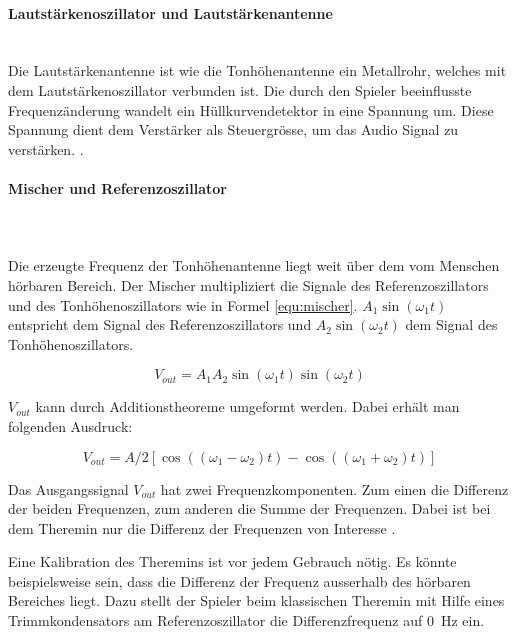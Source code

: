 \paragraph{Lautstärkenoszillator und Lautstärkenantenne}\mbox{}\\ 

Die Lautstärkenantenne ist wie die Tonhöhenantenne ein Metallrohr, welches mit dem Lautstärkenoszillator verbunden ist. Die durch den Spieler beeinflusste Frequenzänderung wandelt ein Hüllkurvendetektor in eine Spannung um. Diese Spannung dient dem Verstärker als Steuergrösse, um das Audio Signal zu verstärken. \cite{Franzis}. 

\paragraph{Mischer und Referenzoszillator}\mbox{}\\ 
\\Die erzeugte Frequenz der Tonhöhenantenne liegt weit über dem vom Menschen hörbaren Bereich. Der Mischer multipliziert die Signale des Referenzoszillators und des Tonhöhenoszillators wie in Formel \ref{equ:mischer}. $A_1\sin(\omega_1t)$ entspricht dem Signal des Referenzoszillators und $A_2\sin(\omega_2t)$ dem Signal des Tonhöhenoszillators.

\begin{equation}
V_{out} = A_{1}A_{2} \sin(\omega_{1}t)   \sin(\omega_{2}t) 
\label{equ:mischer}
\end{equation}

$V_{out}$ kann durch Additionstheoreme umgeformt werden. Dabei erhält man folgenden Ausdruck:

\begin{equation}
V_{out} = A/2[\cos((\omega_{1}-\omega_{2})t)  - \cos((\omega_{1}+\omega_{2})t) ]
\label{equ:mischer_trigo}
\end{equation}

Das Ausgangssignal $V_{out}$ hat zwei Frequenzkomponenten. Zum einen die Differenz der beiden Frequenzen, zum anderen die Summe der Frequenzen. Dabei ist bei dem Theremin nur die Differenz der Frequenzen von Interesse \cite{physik_theremin}.

Eine Kalibration des Theremins ist vor jedem Gebrauch nötig. Es könnte beispielsweise sein, dass die Differenz der Frequenz ausserhalb des hörbaren Bereiches liegt. Dazu stellt der Spieler beim klassischen Theremin mit Hilfe eines Trimmkondensators am Referenzoszillator die Differenzfrequenz auf \SI{0}{Hz} ein.

